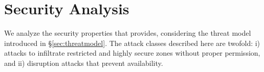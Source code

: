 \chapter{Security Analysis}
\label{analysis}




We analyze the security properties that \name provides, considering the threat model
introduced in \S\ref{sec:threatmodel}. The attack classes described here are twofold:
i) attacks to infiltrate restricted and highly secure zones without proper permission,
and ii) disruption attacks that prevent availability.




